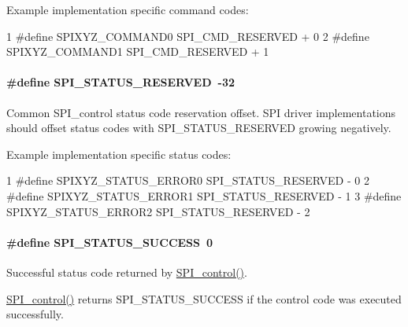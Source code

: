 Example implementation specific command codes\+: 
\begin{DoxyCode}
1 #define SPIXYZ\_COMMAND0         SPI\_CMD\_RESERVED + 0
2 #define SPIXYZ\_COMMAND1         SPI\_CMD\_RESERVED + 1
\end{DoxyCode}
\paragraph[{S\+P\+I\+\_\+\+S\+T\+A\+T\+U\+S\+\_\+\+R\+E\+S\+E\+R\+V\+E\+D}]{\setlength{\rightskip}{0pt plus 5cm}\#define S\+P\+I\+\_\+\+S\+T\+A\+T\+U\+S\+\_\+\+R\+E\+S\+E\+R\+V\+E\+D~-\/32}\label{_s_p_i_8h_ae1af8c6ebf5e8fe481649f65e37b1b9f}
Common S\+P\+I\+\_\+control status code reservation offset. S\+P\+I driver implementations should offset status codes with S\+P\+I\+\_\+\+S\+T\+A\+T\+U\+S\+\_\+\+R\+E\+S\+E\+R\+V\+E\+D growing negatively.

Example implementation specific status codes\+: 
\begin{DoxyCode}
1 #define SPIXYZ\_STATUS\_ERROR0    SPI\_STATUS\_RESERVED - 0
2 #define SPIXYZ\_STATUS\_ERROR1    SPI\_STATUS\_RESERVED - 1
3 #define SPIXYZ\_STATUS\_ERROR2    SPI\_STATUS\_RESERVED - 2
\end{DoxyCode}
\paragraph[{S\+P\+I\+\_\+\+S\+T\+A\+T\+U\+S\+\_\+\+S\+U\+C\+C\+E\+S\+S}]{\setlength{\rightskip}{0pt plus 5cm}\#define S\+P\+I\+\_\+\+S\+T\+A\+T\+U\+S\+\_\+\+S\+U\+C\+C\+E\+S\+S~0}\label{_s_p_i_8h_ab38fa90ff62128dbc98b2ecd84ca106f}


Successful status code returned by \hyperlink{_s_p_i_8h_ab9d3a23991be2741f382749d3844cc2f}{S\+P\+I\+\_\+control()}. 

\hyperlink{_s_p_i_8h_ab9d3a23991be2741f382749d3844cc2f}{S\+P\+I\+\_\+control()} returns S\+P\+I\+\_\+\+S\+T\+A\+T\+U\+S\+\_\+\+S\+U\+C\+C\+E\+S\+S if the control code was executed successfully. 
